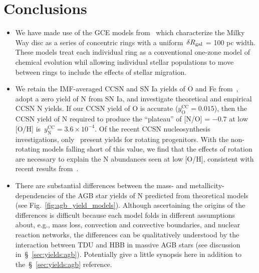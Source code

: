 \documentclass[ms.tex]{subfiles}
\begin{document}
 

\section{Conclusions} 
\label{sec:conclusions} 

\begin{itemize} 
	\item We have made use of the GCE models from~\citet{Johnson2021} which 
	characterize the Milky Way disc as a series of concentric rings with a 
	uniform~$\delta R_\text{gal}$ = 100 pc width. 
	These models treat each individual ring as a conventional one-zone model 
	of chemical evolution whil allowing individual stellar populations to move 
	between rings to include the effects of stellar migration. 

	\item We retain the IMF-averaged CCSN and SN Ia yields of O and Fe 
	from~\citet{Johnson2021}, adopt a zero yield of N from SN Ia, and 
	investigate theoretical and empirical CCSN N yields. 
	If our CCSN yield of O is accurate ($y_\text{O}^\text{CC} = 0.015$), then 
	the CCSN yield of N required to produce the ``plateau'' of [N/O] = $-0.7$ 
	at low [O/H] is~$y_\text{N}^\text{CC} = 3.6\times10^{-4}$. 
	Of the recent CCSN nucleosynthesis investigations, only~\citet{Limongi2018} 
	present yields for rotating progenitors. 
	With the non-rotating models falling short of this value, we find that the 
	effects of rotation are necessary to explain the N abundances seen at low 
	[O/H], consistent with recent results from~\citet{Grisoni2021}. 

	\item There are substantial differences between the mass- and 
	metallicity-dependencies of the AGB star yields of N predicted from 
	theoretical models (see Fig.~\ref{fig:agb_yield_models}). 
	Although ascertaining the origins of the differences is difficult because 
	each model folds in different assumptions about, e.g., mass loss, 
	convection and convective boundaries, and nuclear reaction networks, the 
	differences can be qualitatively understood by the interaction between 
	TDU and HBB in massive AGB stars (see discussion 
	in~\S~\ref{sec:yields:agb}). 
	{\color{red} 
	Potentially give a little synopsis here in addition to 
	the~\S~\ref{sec:yields:agb} reference. 
	} 


\end{itemize}
\end{document}
